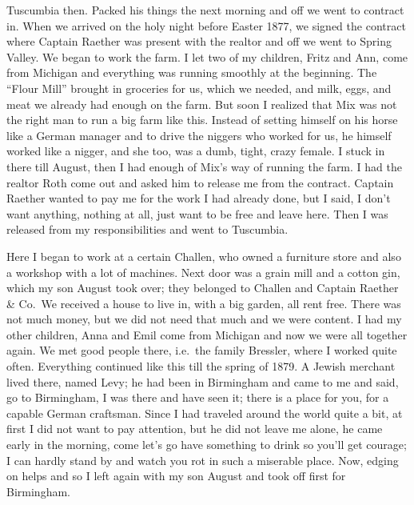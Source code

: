 Tuscumbia then. Packed his things the next morning and off we went to contract in. When we arrived on the holy night before Easter 1877, we signed the contract where Captain Raether was present with the realtor and off we went to Spring Valley. We began to work the farm. I let two of my children, Fritz and Ann, come from Michigan and everything was running smoothly at the beginning. The ``Flour Mill'' brought in groceries for us, which we needed, and milk, eggs, and meat we already had enough on the farm. But soon I realized that Mix was not the right man to run a big farm like this. Instead of setting himself on his horse like a German manager and to drive the niggers who worked for us, he himself worked like a nigger, and she too, was a dumb, tight, crazy female. I stuck in there till August, then I had enough of Mix's way of running the farm. I had the realtor Roth come out and asked him to release me from the contract. Captain Raether wanted to pay me for the work I had already done, but I said, I don't want anything, nothing at all, just want to be free and leave here. Then I was released from my responsibilities and went to Tuscumbia.

Here I began to work at a certain Challen, who owned a furniture store and also a workshop with a lot of machines. Next door was a grain mill and a cotton gin, which my son August took over; they belonged to Challen and Captain Raether \& Co.~We received a house to live in, with a big garden, all rent free. There was not much money, but we did not need that much and we were content. I had my other children, Anna and Emil come from Michigan and now we were all together again. We met good people there, i.e.~the family Bressler, where I worked quite often. Everything continued like this till the spring of 1879. A Jewish merchant lived there, named Levy; he had been in Birmingham and came to me and said, go to Birmingham, I was there and have seen it; there is a place for you, for a capable German craftsman. Since I had traveled around the world quite a bit, at first I did not want to pay attention, but he did not leave me alone, he came early in the morning, come let's go have something to drink so you'll get courage; I can hardly stand by and watch you rot in such a miserable place. Now, edging on helps and so I left again with my son August and took off first for Birmingham.

